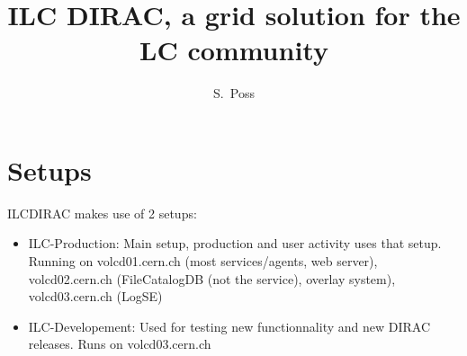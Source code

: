 \documentclass[a4paper,12pt]{article}
\title{ILC DIRAC, a grid solution for the LC community}
\author{S.~Poss}
\begin{document}
\maketitle
{}

\section{Setups}
ILCDIRAC makes use of 2 setups:
\begin{itemize}
  \item ILC-Production: Main setup, production and user activity uses that
  setup. Running on volcd01.cern.ch (most services/agents, web server),
  volcd02.cern.ch (FileCatalogDB (not the service), overlay system), volcd03.cern.ch (LogSE)
  \item ILC-Developement: Used for testing new functionnality and new DIRAC
  releases. Runs on volcd03.cern.ch
\end{itemize}
\end{document}
